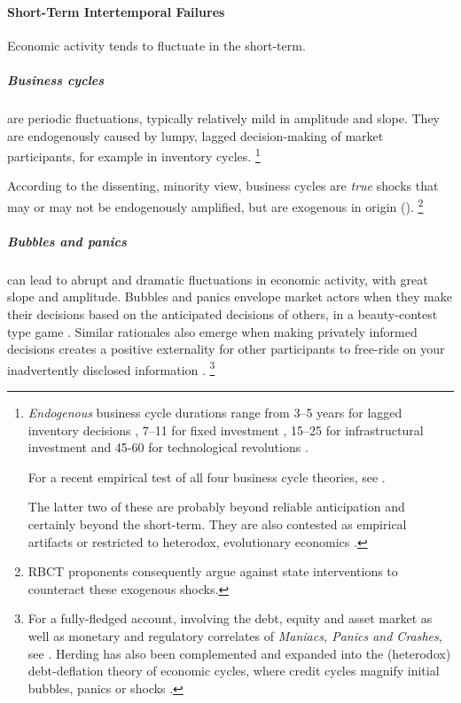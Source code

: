 \paragraph{Short-Term Intertemporal Failures} \label{sec:short-term-inconsistency} Economic activity tends to fluctuate in the short-term.

\subparagraph{Business cycles} are periodic fluctuations, typically relatively mild in amplitude and slope.
They are endogenously caused by lumpy, lagged decision-making of market participants, for example in inventory cycles.
\footnote{
	\emph{Endogenous} business cycle durations range from 3--5 years for lagged inventory decisions \citep{Kitchin1923}, 7--11 for fixed investment \citep{Juglar1862}, 15--25 for infrastructural investment \citep{Kuznets1930} and 45-60 for technological revolutions \citep{Kondratiev1925}.

	For a recent empirical test of all four business cycle theories, see \cite{Korotayev2010}.

	The latter two of these are probably beyond reliable anticipation and certainly beyond the short-term.
	They are also contested as empirical artifacts \citep{Howrey1968} or restricted to heterodox, evolutionary economics \citep{Modelski2010}.
}

According to the dissenting, minority view, business cycles are \emph{true} shocks that may or may not be endogenously amplified, but are exogenous in origin (\citealt{Kydland1982}).
\footnote{
	\gls{RBCT} proponents consequently argue against state interventions to counteract these exogenous shocks.
}

\subparagraph{Bubbles and panics} can lead to abrupt and dramatic fluctuations in economic activity, with great slope and amplitude.
Bubbles and panics envelope market actors when they make their decisions based on the anticipated decisions of others, in a beauty-contest type game \citep{Keynes1936}.
Similar rationales also emerge when making privately informed decisions creates a positive externality for other participants to free-ride on your inadvertently disclosed information \citep{Banerjee-1992-aa}.
\footnote{
	For a fully-fledged account, involving the debt, equity and asset market as well as monetary and regulatory correlates of \emph{Maniacs, Panics and Crashes}, see \cite{KindlebergerAliber-2005-aa}.
	Herding has also been complemented and expanded into the (heterodox) debt-deflation theory of economic cycles, where credit cycles magnify initial bubbles, panics or shocks \citep{Fisher1933}.
}

